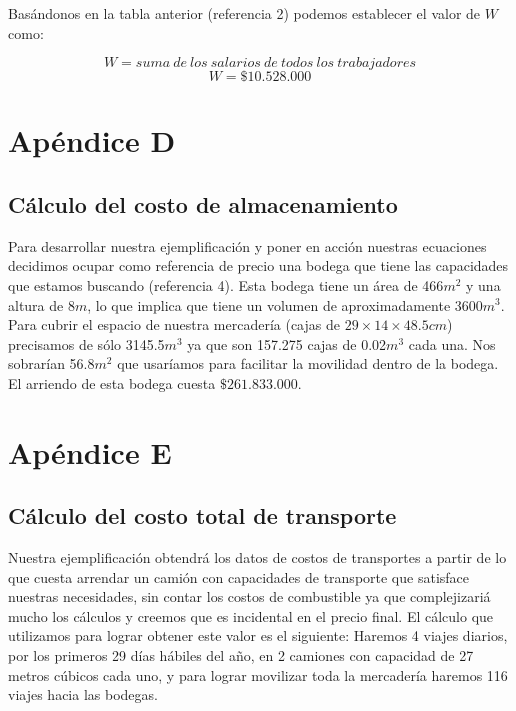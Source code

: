 \documentclass[12pt]{report}
\begin{document}
\begin{center}
Bas\'andonos en la tabla anterior (referencia 2) podemos establecer el valor de $W$ como:
\end{center}
$$W = suma\: de\: los\: salarios\: de\: todos\: los\: trabajadores$$
$$W = \$10.528.000$$

\section*{Ap\'endice D}

\subsection*{C\'alculo del costo de almacenamiento}

Para desarrollar nuestra ejemplificaci\'on y poner en acci\'on nuestras ecuaciones decidimos ocupar como referencia de precio una bodega que tiene las capacidades que estamos buscando (referencia 4). Esta bodega tiene un \'area de 466$m^{2}$ y una altura de 8$m$, lo que implica que tiene un volumen de aproximadamente 3600$m^{3}$. Para cubrir el espacio de nuestra mercader\'ia (cajas de $29 \times 14 \times 48.5 cm$) precisamos de s\'olo 3145.5$m^{3}$ ya que son 157.275 cajas de 0.02$m^{3}$ cada una. Nos sobrar\'ian 56.8$m^{2}$ que usar\'iamos para facilitar la movilidad dentro de la bodega. El arriendo de esta bodega cuesta $\$261.833.000$.


\section*{Ap\'endice E}

\subsection*{C\'alculo del costo total de transporte}

Nuestra ejemplificaci\'on obtendr\'a los datos de costos de transportes a partir de lo que cuesta arrendar un cami\'on con capacidades de transporte que satisface nuestras necesidades, sin contar los costos de combustible ya que complejizari\'a mucho los c\'alculos y creemos que es incidental en el precio final. El c\'alculo que utilizamos para lograr obtener este valor es el siguiente: Haremos 4 viajes diarios, por los primeros 29 d\'ias h\'abiles del a\~no, en 2 camiones con capacidad de 27 metros c\'ubicos cada uno, y para lograr movilizar toda la mercader\'ia haremos 116 viajes hacia las bodegas.
\end{document}
